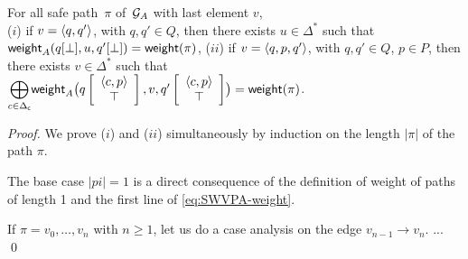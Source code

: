 \begin{lemma}[Correctness]
For all safe path~$\pi$ of~$\mathcal{G}_A$ %
with last element $v$, \\
($i$) if $v = \< q, q'>$, with $q, q' \in Q$, 
then there exists $u \in \Delta^*$ such that 
$\mathsf{weight}_A(q[\bot], u, q'[\bot]) = \mathsf{weight}(\pi)$,
%
($ii$) if $v = \< q, p, q'>$, with $q, q' \in Q$, $p\in P$, 
then there exists $v \in \Delta^*$ such that 
${\displaystyle\bigoplus_{c \in \Deltac}}
 \weight_A\bigl(\configup{q}{\< c, p> \stackup \top }, v, \configup{q'}{\<c, p> \stackup \top}\bigr)
 = \weight(\pi)$.
\end{lemma}
%
\begin{proof}
We prove ($i$) and ($ii$) simultaneously by induction on the length $|\pi|$ of the path $\pi$.

\noindent
The base case $|pi| = 1$ is a direct consequence of the definition of weight of paths of length 1
and the first line of \eqref{eq:SWVPA-weight}.

\noindent
If $\pi = v_0,\ldots, v_n$ with $n \geq 1$, 
let us do a case analysis on the edge $v_{n-1} \to v_n$.
...
\qed
\end{proof}




